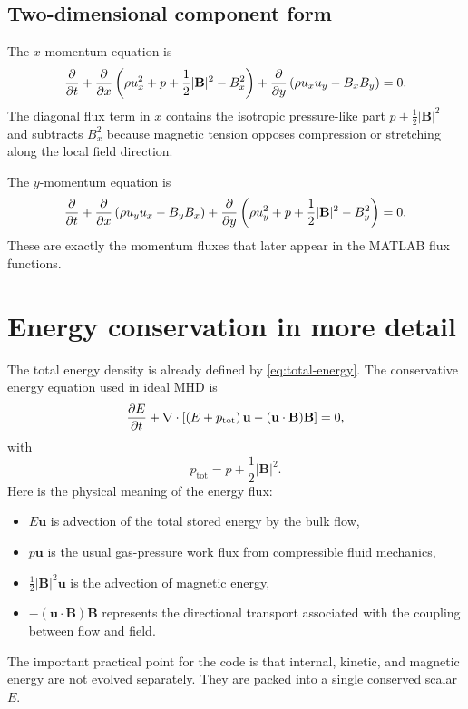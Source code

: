 \documentclass[11pt]{article}
\newcommand{\uvec}{\mathbf{u}}
\newcommand{\Bvec}{\mathbf{B}}
\newcommand{\ptot}{p_{\mathrm{tot}}}
\begin{document}
\subsection{Two-dimensional component form}
The $x$-momentum equation is
\begin{equation}
\pdv{}{t}(\rho u_x)
+ \pdv{}{x}\left(\rho u_x^2 + p + \frac12 |\Bvec|^2 - B_x^2\right)
+ \pdv{}{y}\left(\rho u_xu_y - B_xB_y\right)=0.
\label{eq:xmom2d}
\end{equation}
The diagonal flux term in $x$ contains the isotropic pressure-like part $p+\frac12|\Bvec|^2$ and subtracts $B_x^2$ because magnetic tension opposes compression or stretching along the local field direction.

The $y$-momentum equation is
\begin{equation}
\pdv{}{t}(\rho u_y)
+ \pdv{}{x}\left(\rho u_yu_x - B_yB_x\right)
+ \pdv{}{y}\left(\rho u_y^2 + p + \frac12 |\Bvec|^2 - B_y^2\right)=0.
\label{eq:ymom2d}
\end{equation}
These are exactly the momentum fluxes that later appear in the MATLAB flux functions.

\section{Energy conservation in more detail}
The total energy density is already defined by \eqref{eq:total-energy}. The conservative energy equation used in ideal MHD is
\begin{equation}
\pdv{E}{t} + \nabla\cdot\left[\left(E+\ptot\right)\uvec - (\uvec\cdot\Bvec)\Bvec\right]=0,
\label{eq:energy-cons}
\end{equation}
with
\begin{equation}
\ptot = p + \frac12 |\Bvec|^2.
\label{eq:ptot}
\end{equation}
Here is the physical meaning of the energy flux:
\begin{itemize}[leftmargin=1.8em]
    \item $E\uvec$ is advection of the total stored energy by the bulk flow,
    \item $p\uvec$ is the usual gas-pressure work flux from compressible fluid mechanics,
    \item $\frac12|\Bvec|^2\uvec$ is the advection of magnetic energy,
    \item $-(\uvec\cdot\Bvec)\Bvec$ represents the directional transport associated with the coupling between flow and field.
\end{itemize}
The important practical point for the code is that internal, kinetic, and magnetic energy are not evolved separately. They are packed into a single conserved scalar $E$.
\end{document}
